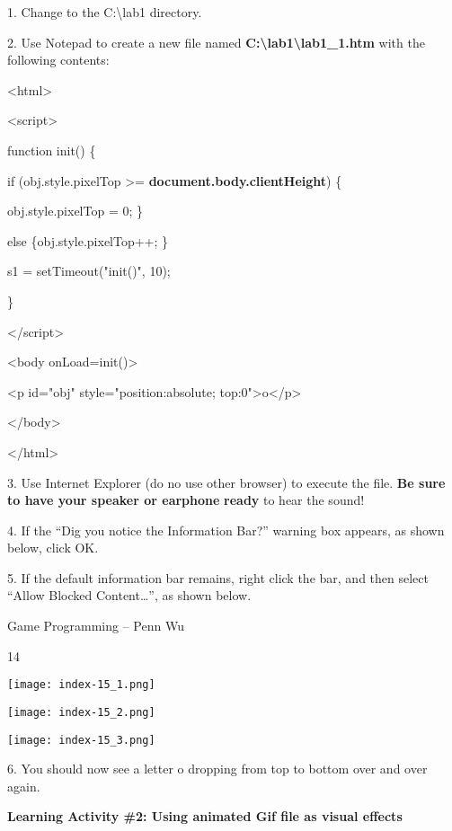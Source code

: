 \documentclass[
]{article}
\begin{document}
\textbf{}

1. Change to the C:\textbackslash lab1 directory.

2. Use Notepad to create a new file named
\textbf{C:\textbackslash lab1\textbackslash lab1\_1.htm} with the
following contents:

\textless html\textgreater{}

\textless script\textgreater{}

function init() \{

if (obj.style.pixelTop \textgreater=
\textbf{document.body.clientHeight}) \{

obj.style.pixelTop = 0; \}

else \{obj.style.pixelTop++; \}

s1 = setTimeout("init()", 10);

\}

\textless/script\textgreater{}

\textless body onLoad=init()\textgreater{}

\textless p id="obj" style="position:absolute;
top:0"\textgreater o\textless/p\textgreater{}

\textless/body\textgreater{}

\textless/html\textgreater{}

3. Use Internet Explorer (do no use other browser) to execute the file.
\textbf{Be sure to have your speaker or earphone} \textbf{ready} to hear
the sound!

4. If the ``Dig you notice the Information Bar?'' warning box appears,
as shown below, click OK.

5. If the default information bar remains, right click the bar, and then
select ``Allow Blocked Content\ldots'', as shown below.

Game Programming -- Penn Wu

14

\protect\hypertarget{index_split_002.htmlux5cux23p15}{}{}\texttt{[image: index-15\_1.png]}

\texttt{[image: index-15\_2.png]}

\texttt{[image: index-15\_3.png]}

6. You should now see a letter o dropping from top to bottom over and
over again.

\textbf{}

\textbf{}

\textbf{}

\textbf{Learning Activity \#2: Using animated Gif file as visual
effects}
\end{document}
